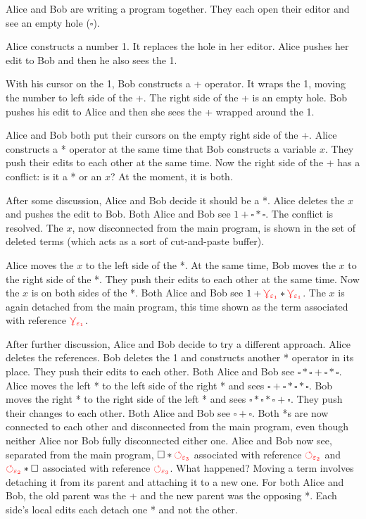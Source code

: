 \documentclass[nonacm, acmsmall, screen, review]{acmart}
\newcommand{\e}{\varepsilon}
\newcommand{\hole}{\ensuremath{\square}} %
\newcommand{\multiVertex}[1]{\textcolor{red}{\ensuremath{\curlyveedownarrow_{#1}}}}
\newcommand{\cycleVertex}[1]{\textcolor{red}{\ensuremath{\circlearrowleft_{#1}}}}
\begin{document}
Alice and Bob are writing a program together.
They each open their editor and see an empty hole ($\hole$).

Alice constructs a number 1.
It replaces the hole in her editor.
Alice pushes her edit to Bob and then he also sees the 1.

With his cursor on the 1, Bob constructs a + operator.
It wraps the 1, moving the number to left side of the +.
The right side of the + is an empty hole.
Bob pushes his edit to Alice and then she sees the + wrapped around the 1.

Alice and Bob both put their cursors on the empty right side of the +.
Alice constructs a * operator at the same time that Bob constructs a variable $x$.
They push their edits to each other at the same time.
Now the right side of the + has a conflict: is it a * or an $x$?
At the moment, it is both.

After some discussion, Alice and Bob decide it should be a *.
Alice deletes the $x$ and pushes the edit to Bob.
Both Alice and Bob see $1 + \hole * \hole$.
The conflict is resolved.
The $x$, now disconnected from the main program, is shown in the set of deleted terms (which acts as a sort of cut-and-paste buffer).

Alice moves the $x$ to the left side of the *.
At the same time, Bob moves the $x$ to the right side of the *.
They push their edits to each other at the same time.
Now the $x$ is on both sides of the *.
Both Alice and Bob see $1 + \multiVertex{\e_1} * \multiVertex{\e_1}$.
The $x$ is again detached from the main program, this time shown as the term associated with reference $\multiVertex{\e_1}$.

After further discussion, Alice and Bob decide to try a different approach.
Alice deletes the references.
Bob deletes the 1 and constructs another * operator in its place.
They push their edits to each other.
Both Alice and Bob see $\hole * \hole + \hole * \hole$.
Alice moves the left * to the left side of the right * and sees $\hole + \hole * \hole * \hole$.
Bob moves the right * to the right side of the left * and sees $\hole * \hole * \hole + \hole$.
They push their changes to each other.
Both Alice and Bob see $\hole + \hole$.
Both *s are now connected to each other and disconnected from the main program, even though neither Alice nor Bob fully disconnected either one.
Alice and Bob now see, separated from the main program, $\hole * \cycleVertex{\e_3}$ associated with reference $\cycleVertex{\e_2}$ and $\cycleVertex{\e_2} * \hole$ associated with reference $\cycleVertex{\e_3}$.
What happened?
Moving a term involves detaching it from its parent and attaching it to a new one.
For both Alice and Bob, the old parent was the + and the new parent was the opposing *.
Each side's local edits each detach one * and not the other.
\end{document}
